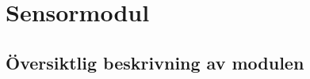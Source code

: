 \documentclass[systemskiss/skiss.tex]{subfiles}
\begin{document}
\section{Sensormodul}

\subsection{Översiktlig beskrivning av modulen}
\end{document}
